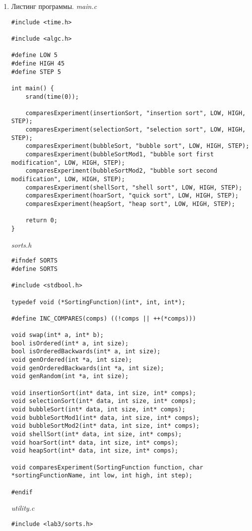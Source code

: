 \documentclass[a4paper,14pt]{extarticle}
\begin{document}
\begin{enumerate}
	\item Листинг программы.
	      \textit{main.c}
	      \begin{verbatim}
#include <time.h>

#include <algc.h>

#define LOW 5
#define HIGH 45
#define STEP 5

int main() {
    srand(time(0));

    comparesExperiment(insertionSort, "insertion sort", LOW, HIGH, STEP);
    comparesExperiment(selectionSort, "selection sort", LOW, HIGH, STEP);
    comparesExperiment(bubbleSort, "bubble sort", LOW, HIGH, STEP);
    comparesExperiment(bubbleSortMod1, "bubble sort first modification", LOW, HIGH, STEP);
    comparesExperiment(bubbleSortMod2, "bubble sort second modification", LOW, HIGH, STEP);
    comparesExperiment(shellSort, "shell sort", LOW, HIGH, STEP);
    comparesExperiment(hoarSort, "quick sort", LOW, HIGH, STEP);
    comparesExperiment(heapSort, "heap sort", LOW, HIGH, STEP);

    return 0;
}
	\end{verbatim}
	      \textit{sorts.h}
	      \begin{verbatim}
#ifndef SORTS
#define SORTS

#include <stdbool.h>

typedef void (*SortingFunction)(int*, int, int*);

#define INC_COMPARES(comps) ((!comps || ++(*comps)))

void swap(int* a, int* b);
bool isOrdered(int* a, int size);
bool isOrderedBackwards(int* a, int size);
void genOrdered(int *a, int size);
void genOrderedBackwards(int *a, int size);
void genRandom(int *a, int size);

void insertionSort(int* data, int size, int* comps);
void selectionSort(int* data, int size, int* comps);
void bubbleSort(int* data, int size, int* comps);
void bubbleSortMod1(int* data, int size, int* comps);
void bubbleSortMod2(int* data, int size, int* comps);
void shellSort(int* data, int size, int* comps);
void hoarSort(int* data, int size, int* comps);
void heapSort(int* data, int size, int* comps);

void comparesExperiment(SortingFunction function, char *sortingFunctionName, int low, int high, int step);

#endif
	\end{verbatim}
	      \textit{utility.c}
	      \begin{verbatim}
#include <lab3/sorts.h>


\end{verbatim}
\end{enumerate}
\end{document}
